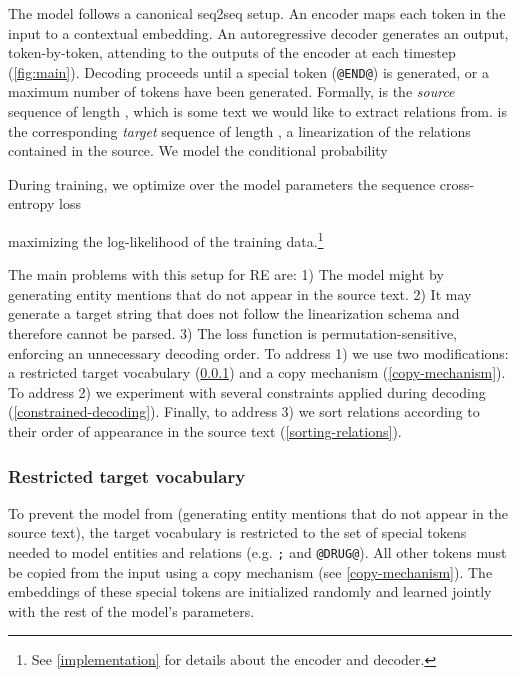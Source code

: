 \documentclass[11pt]{article}
\begin{document}
The model follows a canonical seq2seq setup. An encoder maps each token in the input to a contextual embedding. An autoregressive decoder generates an output, token-by-token, attending to the outputs of the encoder at each timestep (\autoref{fig:main}). Decoding proceeds until a special  token (\texttt{@END@}) is generated, or a maximum number of tokens have been generated. Formally,  is the \textit{source} sequence of length , which is some text we would like to extract relations from.  is the corresponding \textit{target} sequence of length , a linearization of the relations contained in the source. We model the conditional probability



\noindent During training, we optimize over the model parameters  the sequence cross-entropy loss



\noindent maximizing the log-likelihood of the training data.\footnote{See \textsection \ref{implementation} for details about the encoder and decoder.} 

The main problems with this setup for RE are: 1) The model might  by generating entity mentions that do not appear in the source text. 2) It may generate a target string that does not follow the linearization schema and therefore cannot be parsed. 3) The loss function is permutation-sensitive, enforcing an unnecessary decoding order. To address 1) we use two modifications: a restricted target vocabulary (\textsection\ref{restricted-target-vocabulary}) and a copy mechanism (\textsection\ref{copy-mechanism}). To address 2) we experiment with several constraints applied during decoding (\textsection\ref{constrained-decoding}). Finally, to address 3) we sort relations according to their order of appearance in the source text (\textsection\ref{sorting-relations}).

\subsubsection{Restricted target vocabulary} \label{restricted-target-vocabulary}

To prevent the model from  (generating entity mentions that do not appear in the source text), the target vocabulary is restricted to the set of special tokens needed to model entities and relations (e.g. \texttt{;} and \texttt{@DRUG@}). All other tokens must be copied from the input using a copy mechanism (see \textsection\ref{copy-mechanism}). The embeddings of these special tokens are initialized randomly and learned jointly with the rest of the model's parameters.
\end{document}
